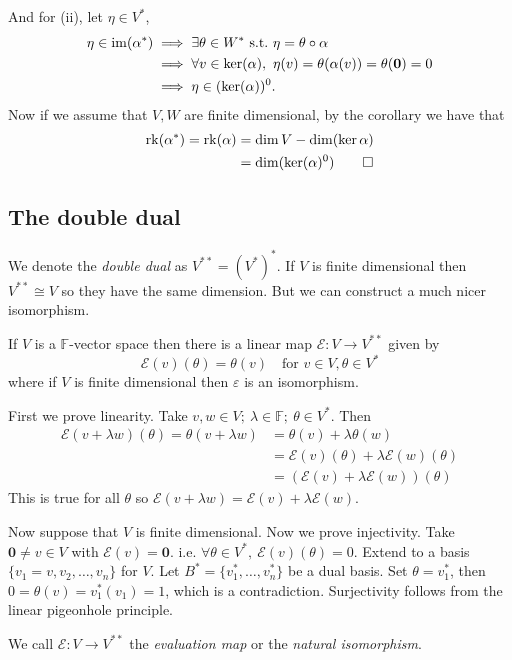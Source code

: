 \documentclass{article}
\newcommand{\F}{\mathbb{F}}
\newcommand{\rk}{\mathrm{rk}}
\begin{document}
And for (ii), let $ \eta\in V^* $,
\begin{align*}
	\eta\in\ima(\alpha^*)&\implies\exists\theta\in W^*\st \eta=\theta\circ\alpha\\
			     &\implies \forall v\in \ker(\alpha),\ \eta(v)=\theta(\alpha(v))=\theta(\mathbf 0)=0\\
			     &\implies \eta\in(\ker(\alpha))^0.
\end{align*}
Now if we assume that $ V,W $ are finite dimensional, by the corollary we have that
\begin{align*}
	\rk(\alpha^*)=\rk(\alpha)&=\dim V-\dim(\ker\alpha)\\
				 &=\dim(\ker(\alpha)^0)\qed
\end{align*}
\subsection{The double dual}
We denote the \textit{double dual} as $ V^{**}=(V^*)^* $. If $ V $ is finite dimensional then $ V^{**}\cong V $ so they have the same dimension. But we can construct a much nicer isomorphism.
\begin{theorem}
	If $ V $ is a $ \F $-vector space then there is a linear map $ \mathcal E:V\to V^{**} $ given by
	\[
		\mathcal E(v)(\theta)=\theta(v)\quad\text{for }v\in V, \theta\in V^*
	\]
	where if $ V $ is finite dimensional then $ \varepsilon $ is an isomorphism.
\end{theorem}
\pf First we prove linearity. Take $ v,w\in V;\ \lambda\in \F;\ \theta\in V^*$. Then
\begin{align*}
	\mathcal E(v+\lambda w)(\theta)=\theta(v+\lambda w)&=\theta(v)+\lambda\theta(w)\\
							    &= \mathcal E(v)(\theta)+\lambda\mathcal E(w)(\theta)\\
							    &=(\mathcal E(v)+\lambda\mathcal E(w))(\theta)
\end{align*}
This is true for all $ \theta $ so $ \mathcal E(v+\lambda w)=\mathcal E(v)+\lambda \mathcal E(w) $.\par
Now suppose that $ V $ is finite dimensional. Now we prove injectivity. Take $ \mathbf 0\ne v\in V $ with $ \mathcal E(v)=\mathbf 0 $. i.e. $ \forall \theta\in V^*,\ \mathcal E(v)(\theta)=0 $. Extend to a basis $ \{v_1=v,v_2,\dots, v_n\} $ for $ V $. Let $ B^* =\{ v_1^*,\dots, v_n^*\} $ be a dual basis. Set $ \theta=v_1^* $, then $ 0=\theta(v)=v_1^*(v_1)=1 $, which is a contradiction. Surjectivity follows from the linear pigeonhole principle.
	\begin{definition}
		We call $ \mathcal E:V\to V^{**} $ the \textit{evaluation map} or the \textit{natural isomorphism}.
	\end{definition}
\end{document}
